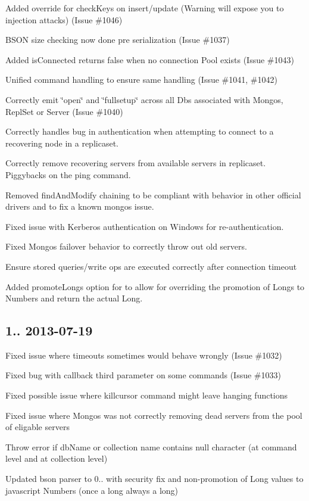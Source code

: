 \begin{DoxyItemize}
\item Added override for check\+Keys on insert/update (Warning will expose you to injection attacks) (Issue \#1046)
\item B\+S\+ON size checking now done pre serialization (Issue \#1037)
\item Added is\+Connected returns false when no connection Pool exists (Issue \#1043)
\item Unified command handling to ensure same handling (Issue \#1041, \#1042)
\item Correctly emit \char`\"{}open\char`\"{} and \char`\"{}fullsetup\char`\"{} across all Db\textquotesingle{}s associated with Mongos, Repl\+Set or Server (Issue \#1040)
\item Correctly handles bug in authentication when attempting to connect to a recovering node in a replicaset.
\item Correctly remove recovering servers from available servers in replicaset. Piggybacks on the ping command.
\item Removed find\+And\+Modify chaining to be compliant with behavior in other official drivers and to fix a known mongos issue.
\item Fixed issue with Kerberos authentication on Windows for re-\/authentication.
\item Fixed Mongos failover behavior to correctly throw out old servers.
\item Ensure stored queries/write ops are executed correctly after connection timeout
\item Added promote\+Longs option for to allow for overriding the promotion of Longs to Numbers and return the actual Long.
\end{DoxyItemize}

\subsection*{1.. 2013-\/07-\/19 }


\begin{DoxyItemize}
\item Fixed issue where timeouts sometimes would behave wrongly (Issue \#1032)
\item Fixed bug with callback third parameter on some commands (Issue \#1033)
\item Fixed possible issue where killcursor command might leave hanging functions
\item Fixed issue where Mongos was not correctly removing dead servers from the pool of eligable servers
\item Throw error if db\+Name or collection name contains null character (at command level and at collection level)
\item Updated bson parser to 0.. with security fix and non-\/promotion of Long values to javascript Numbers (once a long always a long)
\end{DoxyItemize}

